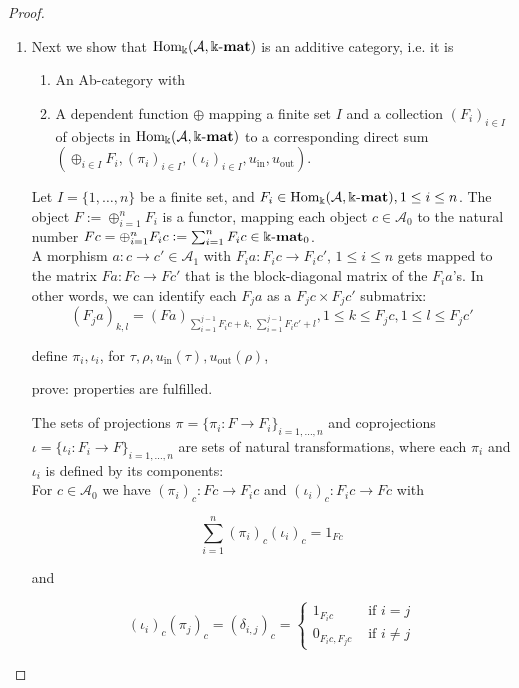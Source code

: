 \begin{proof}
\begin{enumerate}
\item Next we show that $\mathrm{Hom_{\Bbbk}}(\mathcal{A},\Bbbk\textnormal{-}\mathbf{mat})$ is an additive category, i.e. it is
\begin{enumerate}
\renewcommand{\labelenumii}{(\roman{enumii})}
\item An Ab-category with
\item A dependent function $\oplus$ mapping a finite set $I$ and a collection $(F_{i})_{i\in I}$ of objects in $\mathrm{Hom_{\Bbbk}}(\mathcal{A},\Bbbk\textnormal{-}\mathbf{mat})$
to a corresponding direct sum $( \oplus_{i\in I} F_{i}, (\pi_{i})_{i\in I}, (\iota_{i})_{i\in I}, u_{\mathrm{in}}, u_{\mathrm{out}} )$.
\end{enumerate}
\begin{subproof}[Proof of (ii)]
Let $I = \{1,\dots,n\}$ be a finite set, and $F_{i} \in \mathrm{Hom_{\Bbbk}}(\mathcal{A},\Bbbk\textnormal{-}\mathbf{mat}), 1\leq i\leq n$. The object $F := \oplus_{i=1}^{n} F_{i}$ is a functor, mapping
each object $c \in \mathcal{A}_{0}$ to the natural number $Fc = \oplus_{i=1}^{n} F_{i}c := \sum_{i=1}^{n} F_{i}c \in \Bbbk\textnormal{-}\mathbf{mat}_{0}$.\\
A morphism $a : c \rightarrow c' \in \mathcal{A}_{1}$ with $F_{i} a : F_{i} c \rightarrow F_{i} c', \, 1\leq i\leq n$ gets mapped to the matrix 
$F a : Fc \rightarrow Fc'$ that is the block-diagonal matrix of the $F_{i}a$'s.
In other words, we can identify each $F_{j}a$ as a $F_{j} c \times F_{j} c'$ submatrix:
\[
\left(F_{j}a\right)_{k,l} = \left(F a\right)_{\sum_{i=1}^{j-1} F_{i}c + k,\,\sum_{i=1}^{j-1} F_{i}c' + l},
1 \leq k \leq F_{j}c, 1 \leq l \leq F_{j}c'
\]

define $\pi_{i}, \iota_{i}$, for $\tau, \rho, u_{\mathrm{in}}(\tau), u_{\mathrm{out}}(\rho)$,

prove:
properties are fulfilled.

The sets of projections $\pi = \{ \pi_{i} : F \rightarrow F_{i} \}_{i = 1,\dots,n}$ and coprojections
$\iota = \{ \iota_{i} : F_{i} \rightarrow F \}_{i = 1,\dots,n}$ are sets of natural transformations,
where each $\pi_{i}$ and $\iota_{i}$ is defined by its components:\\
For $c \in \mathcal{A}_{0}$ we have $(\pi_{i})_{c} : Fc \rightarrow F_{i}c$ and $(\iota_{i})_{c} : F_{i}c \rightarrow Fc$ with\\
\begin{minipage}{.35\textwidth}
\[
\sum_{i=1}^{n} (\pi_{i})_{c} (\iota_{i})_{c} = 1_{Fc}
\]
\end{minipage}
\begin{minipage}{.1\textwidth}
and
\end{minipage}
\begin{minipage}{.55\textwidth}
\[
(\iota_{i})_{c}(\pi_{j})_{c} = (\delta_{i,j})_{c} = \begin{cases}
1_{F_{i}c} & \text{ if } i = j \\
0_{F_{i}c, F_{j}c} & \text{ if } i \neq j
\end{cases}
\]
\end{minipage}


\end{subproof}
\end{enumerate}
\end{proof}
